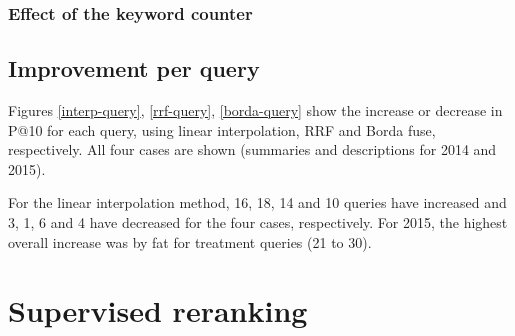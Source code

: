 \subsubsection{Effect of the keyword counter}

\subsection{Improvement per query}

Figures \ref{interp-query}, \ref{rrf-query}, \ref{borda-query} show the increase or decrease in P@10 for each query,
using linear interpolation, RRF and Borda fuse, respectively. All four cases are shown (summaries and descriptions for 2014 and 2015).


For the linear interpolation method, 16, 18, 14 and 10 queries have increased and 3, 1, 6 and 4 have decreased
for the four cases, respectively. For 2015, the highest overall increase was by fat for treatment queries (21 to 30).
% 
% 


\section{Supervised reranking}

